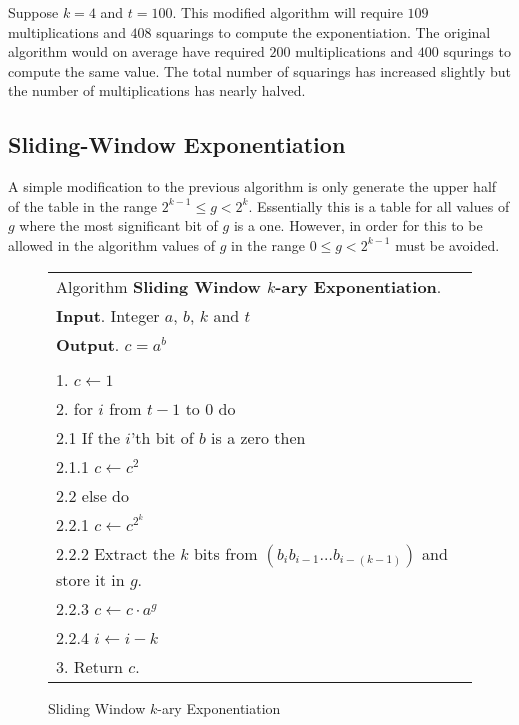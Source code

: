 \documentclass[b5paper]{book}
\begin{document}
Suppose $k = 4$ and $t = 100$.  This modified algorithm will require $109$ multiplications and $408$ squarings to compute the exponentiation.  The
original algorithm would on average have required $200$ multiplications and $400$ squrings to compute the same value.  The total number of squarings
has increased slightly but the number of multiplications has nearly halved.

\subsection{Sliding-Window Exponentiation}
A simple modification to the previous algorithm is only generate the upper half of the table in the range $2^{k-1} \le g < 2^k$.  Essentially
this is a table for all values of $g$ where the most significant bit of $g$ is a one.  However, in order for this to be allowed in the 
algorithm values of $g$ in the range $0 \le g < 2^{k-1}$ must be avoided.  

\newpage\begin{figure}[!here]
\begin{small}
\begin{center}
\begin{tabular}{l}
\hline Algorithm \textbf{Sliding Window $k$-ary Exponentiation}. \\
\textbf{Input}.   Integer $a$, $b$, $k$ and $t$ \\
\textbf{Output}.  $c = a^b$ \\
\hline \\
1.  $c \leftarrow 1$ \\
2.  for $i$ from $t - 1$ to $0$ do \\
\hspace{3mm}2.1  If the $i$'th bit of $b$ is a zero then \\
\hspace{6mm}2.1.1   $c \leftarrow c^2$ \\
\hspace{3mm}2.2  else do \\
\hspace{6mm}2.2.1  $c \leftarrow c^{2^k}$ \\
\hspace{6mm}2.2.2  Extract the $k$ bits from $(b_{i}b_{i-1}\ldots b_{i-(k-1)})$ and store it in $g$. \\
\hspace{6mm}2.2.3  $c \leftarrow c \cdot a^g$ \\
\hspace{6mm}2.2.4  $i \leftarrow i - k$ \\
3.  Return $c$. \\
\hline
\end{tabular}
\end{center}
\end{small}
\caption{Sliding Window $k$-ary Exponentiation}
\end{figure}
\end{document}
